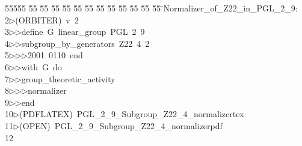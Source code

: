 %
%
\begin{tabbing}
55555 \= 55 \= 55 \= 55 \= 55 \= 55 \= 55 \= 55 \= 55 \= 55 \= 55 \= 55 \= 55 \= \>Normalizer\_of\_Z22\_in\_PGL\_2\_9:\\[0pt]
2\>$\triangleright$\>(ORBITER)\ v\ 2\ \\[0pt]
3\>$\triangleright$\>$\triangleright$\>define\ G\ linear\_group\ PGL\ 2\ 9\ \\[0pt]
4\>$\triangleright$\>$\triangleright$\>subgroup\_by\_generators\ Z22\ 4\ 2\ \\[0pt]
5\>$\triangleright$\>$\triangleright$\>$\triangleright$\>2001\ 0110\ end\ \\[0pt]
6\>$\triangleright$\>$\triangleright$\>with\ G\ do\ \\[0pt]
7\>$\triangleright$\>$\triangleright$\>group\_theoretic\_activity\ \\[0pt]
8\>$\triangleright$\>$\triangleright$\>$\triangleright$\>normalizer\ \\[0pt]
9\>$\triangleright$\>$\triangleright$\>end\\[0pt]
10\>$\triangleright$\>(PDFLATEX)\ PGL\_2\_9\_Subgroup\_Z22\_4\_normalizertex\\[0pt]
11\>$\triangleright$\>(OPEN)\ PGL\_2\_9\_Subgroup\_Z22\_4\_normalizerpdf\\[0pt]
12\>\end{tabbing}
